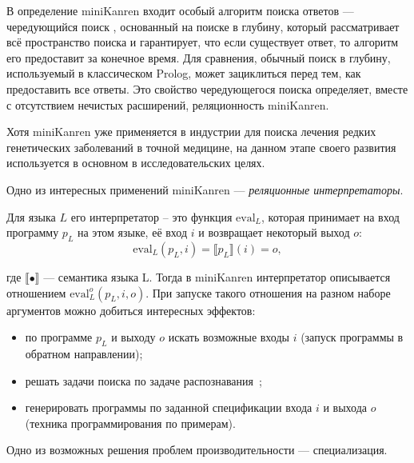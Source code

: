 В определение miniKanren входит особый алгоритм поиска ответов --- чередующийся поиск ,
основанный на поиске в глубину, который рассматривает всё пространство поиска и гарантирует,
что если существует ответ, то алгоритм его предоставит за конечное время.
Для сравнения, обычный поиск в глубину, используемый в классическом Prolog, может зациклиться
перед тем, как предоставить все ответы. Это свойство чередующегося поиска определяет, вместе
с отсутствием нечистых расширений, реляционность miniKanren. 

Хотя miniKanren уже применяется в индустрии для поиска лечения редких генетических
заболеваний в точной медицине\cite{medMK},
на данном этапе своего развития используется в основном в исследовательских целях.

Одно из интересных применений miniKanren --- {\it реляционные интерпретаторы}.

Для языка $L$ его интерпретатор -- это функция $\text{eval}_L$, которая принимает
на вход программу $p_L$ на этом языке, её вход $i$ и возвращает некоторый выход $o$:
\[ \text{eval}_L (p_L, i) = \llbracket p_L \rrbracket (i) = o, \]

где $\llbracket \bullet \rrbracket $ --- семантика языка L.
Тогда в miniKanren интерпретатор описывается отношением $\text{eval}^o_L(p_L, i, o)$.
При запуске такого отношения на разном наборе аргументов можно добиться интересных эффектов:
\begin{itemize}
\item по программе $p_L$ и выходу $o$ искать возможные входы $i$ (запуск программы в обратном направлении);
\item решать задачи поиска по задаче распознавания~\cite{lozov};
\item генерировать программы по заданной спецификации входа $i$ и выхода $o$
(техника программирования по примерам)\cite{unifiedMK}.
\end{itemize}


Одно из возможных решения проблем производительности --- специализация.
